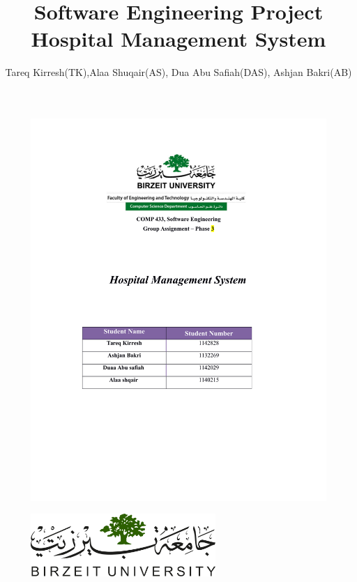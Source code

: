 \documentclass[14pt]{article}
\title{Software Engineering Project\\Hospital Management System}
\author{Tareq Kirresh(TK),Alaa Shuqair(AS), Dua Abu Safiah(DAS), Ashjan Bakri(AB)}
\begin{document}
\begin{figure}[h!]
\centering 
  \includegraphics[width=\textwidth,height=\textheight,keepaspectratio]{Cover.pdf}
\end{figure}
\newpage
\begin{figure}
\centering
  \includegraphics[width=7cm]{LOGO.png}
\end{figure}
\maketitle
\newpage
\tableofcontents 
\newpage 
\end{document}
